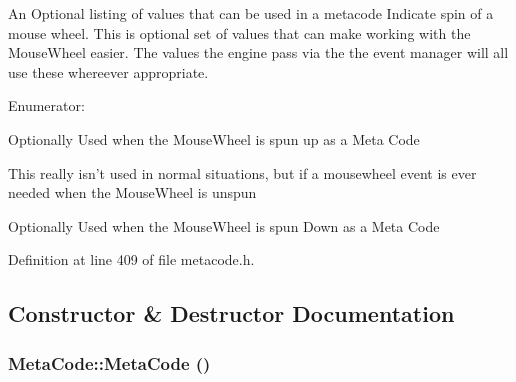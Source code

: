 An Optional listing of values that can be used in a metacode Indicate spin of a mouse wheel. This is optional set of values that can make working with the MouseWheel easier. The values the engine pass via the the event manager will all use these whereever appropriate. \begin{Desc}
\item[Enumerator: ]\par
\begin{description}
\item[{\em 
\hypertarget{classMetaCode_a31155465656363d4ecdf9ce7ae5d7227af0b2479902511454e2018979ee5e39e5}{
MOUSEWHEEL\_\-UP}
\label{d7/d72/classMetaCode_a31155465656363d4ecdf9ce7ae5d7227af0b2479902511454e2018979ee5e39e5}
}]Optionally Used when the MouseWheel is spun up as a Meta Code \item[{\em 
\hypertarget{classMetaCode_a31155465656363d4ecdf9ce7ae5d7227a70b73f42dccd13d9652d83c5f24cd966}{
MOUSEWHEEL\_\-UNCHANGED}
\label{d7/d72/classMetaCode_a31155465656363d4ecdf9ce7ae5d7227a70b73f42dccd13d9652d83c5f24cd966}
}]This really isn't used in normal situations, but if a mousewheel event is ever needed when the MouseWheel is unspun \item[{\em 
\hypertarget{classMetaCode_a31155465656363d4ecdf9ce7ae5d7227a912c43d8503790ded562c0c4a6a62ca7}{
MOUSEWHEEL\_\-DOWN}
\label{d7/d72/classMetaCode_a31155465656363d4ecdf9ce7ae5d7227a912c43d8503790ded562c0c4a6a62ca7}
}]Optionally Used when the MouseWheel is spun Down as a Meta Code \end{description}
\end{Desc}



Definition at line 409 of file metacode.h.

\subsection{Constructor \& Destructor Documentation}
\hypertarget{classMetaCode_a6d4637b2894e5a2d46577c08259a2416}{
\subsubsection[{MetaCode}]{\setlength{\rightskip}{0pt plus 5cm}MetaCode::MetaCode ()}}
\label{d7/d72/classMetaCode_a6d4637b2894e5a2d46577c08259a2416}


